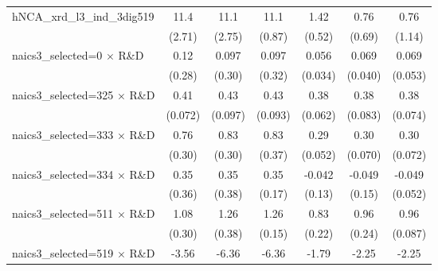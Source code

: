 {\begin{tabular}{l*{6}{c}}
\addlinespace
hNCA\_xrd\_l3\_ind\_3dig519&        11.4\sym{***}&        11.1\sym{***}&        11.1\sym{***}&        1.42\sym{***}&        0.76         &        0.76         \\
                    &      (2.71)         &      (2.75)         &      (0.87)         &      (0.52)         &      (0.69)         &      (1.14)         \\
\addlinespace
naics3\_selected=0 $\times$ R\&D&        0.12         &       0.097         &       0.097         &       0.056         &       0.069\sym{*}  &       0.069         \\
                    &      (0.28)         &      (0.30)         &      (0.32)         &     (0.034)         &     (0.040)         &     (0.053)         \\
\addlinespace
naics3\_selected=325 $\times$ R\&D&        0.41\sym{***}&        0.43\sym{***}&        0.43\sym{***}&        0.38\sym{***}&        0.38\sym{***}&        0.38\sym{***}\\
                    &     (0.072)         &     (0.097)         &     (0.093)         &     (0.062)         &     (0.083)         &     (0.074)         \\
\addlinespace
naics3\_selected=333 $\times$ R\&D&        0.76\sym{**} &        0.83\sym{***}&        0.83\sym{**} &        0.29\sym{***}&        0.30\sym{***}&        0.30\sym{***}\\
                    &      (0.30)         &      (0.30)         &      (0.37)         &     (0.052)         &     (0.070)         &     (0.072)         \\
\addlinespace
naics3\_selected=334 $\times$ R\&D&        0.35         &        0.35         &        0.35\sym{**} &      -0.042         &      -0.049         &      -0.049         \\
                    &      (0.36)         &      (0.38)         &      (0.17)         &      (0.13)         &      (0.15)         &     (0.052)         \\
\addlinespace
naics3\_selected=511 $\times$ R\&D&        1.08\sym{***}&        1.26\sym{***}&        1.26\sym{***}&        0.83\sym{***}&        0.96\sym{***}&        0.96\sym{***}\\
                    &      (0.30)         &      (0.38)         &      (0.15)         &      (0.22)         &      (0.24)         &     (0.087)         \\
\addlinespace
naics3\_selected=519 $\times$ R\&D&       -3.56         &       -6.36\sym{***}&       -6.36\sym{***}&       -1.79\sym{***}&       -2.25\sym{***}&       -2.25\sym{***}\\

\end{tabular}}
